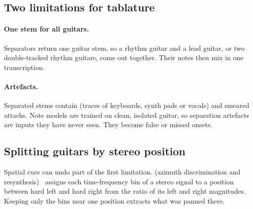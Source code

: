 \subsection{Two limitations for tablature}

\paragraph{One stem for all guitars.} Separators return one guitar stem, so a
rhythm guitar and a lead guitar, or two double-tracked rhythm guitars, come out
together. Their notes then mix in one transcription.

\paragraph{Artefacts.} Separated stems contain  (traces of
keyboards, synth pads or vocals) and smeared attacks. Note models are trained on
clean, isolated guitar, so separation artefacts are inputs they have never
seen. They become false or missed onsets.

\subsection{Splitting guitars by stereo position}
\label{sec:pan-split}

Spatial cues can undo part of the first limitation.  (azimuth
discrimination and resynthesis)~\cite{barry2004adress} assigns each
time-frequency bin of a stereo signal to a position between hard left and hard
right from the ratio of its left and right magnitudes. Keeping only the bins
near one position extracts what was panned there.

